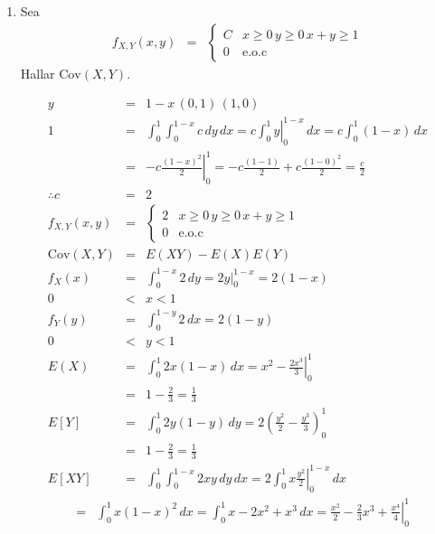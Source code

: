 \begin{enumerate}
\item Sea \begin{eqnarray*} f_{X,Y} \left( x,y \right) &=& \begin{cases}
C  & x\geq 0 \, y \geq 0 \, x+y\geq 1\\
0 &  \textrm{e.o.c} 
\end{cases}\end{eqnarray*}
 Hallar $ \textrm{Cov} \left(X,Y \right) $.
 
\begin{eqnarray*} 
y &=& 1-x \, \left( 0,1 \right) \, \left(1,0 \right)\\
1 &=& \int_{0}^{1} \int _{0}^{1-x} c \, dy \, dx= \left. c \int _{0}^{1} y \right|_{0}^{1-x} \, dx = c \int _{0}^{1} \left( 1-x  \right) \, dx \\
&=& \left. -c \frac{\left(1-x \right)^2 }{2} \right| _{0}^{1} = -c \frac{\left(1-1 \right) }{2} + c \frac{\left( 1-0\right)^2 }{2} = \frac{c}{2}\\
\therefore c &=& 2\\
 f_{X,Y} \left( x,y \right) &=& \begin{cases}
2  & x\geq 0 \, y \geq 0 \, x+y\geq 1\\
0 &  \textrm{e.o.c} 
\end{cases}\\
 \textrm{Cov} \left(X,Y \right) &=& E \left(XY \right)- E \left(X \right)E \left(Y \right)\\
 f_{X} \left(x \right) &=& \int _{0}^{1-x} 2 \, dy = \left. 2y  \right| _{0}^{1-x} = 2 \left(1-x \right) \\
  0 &<& x<1\\
 f_{Y} \left(y \right) &=& \int _{0}^{1-y} 2 \, dx =  2 \left(1-y \right) \\
  0 &<& y<1\\
   E \left(X \right) &=& \int _{0} ^{1} 2x \left(1-x \right) \, dx = x^2- \left.\frac{2x ^3}{3} \right| _{0} ^{1} \\
  &=& 1- \frac{2}{3} = \frac{1}{3}\\
  E \left[ Y \right]& =& \int_{0} ^{1} 2y \left( 1-y\right) \, dy = 2 \left(\frac{y^2}{2}- \frac{y^3}{3} \right)_{0} ^{1}\\
  &=& 1- \frac{2}{3} = \frac{1}{3}\\
   E \left[ XY \right] &=& \int _{0} ^{1} \int _{0}^{1-x} 2xy \, dy \, dx = 2 \int _{0}^{1} \left. x \frac{y^2}{2}\right|_{0}^{1-x} \, dx
   \end{eqnarray*}
\begin{eqnarray*}
   &=& \int _{0} ^1 x \left(1-x \right)^{2} \, dx = \int _{0}^{1} x- 2x^2+x^3 \, dx = \left. \frac{x^2}{2}- \frac{2}{3} x^3 + \frac{x^4}{4} \right| _{0}^{1} \\

\end{eqnarray*}
\end{enumerate}
